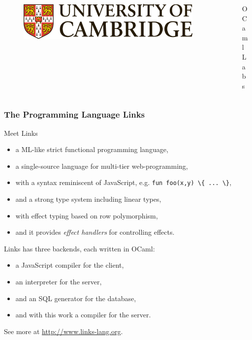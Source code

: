 \documentclass[10pt,compress]{beamer}
\begin{document}
\begin{frame}[plain]
\vfill

\begin{columns}[T]
\begin{column}{0.5\textwidth}
\begin{figure}
\includegraphics[scale=0.18]{figures/cambridge.eps}
\end{figure}
\end{column}
\hfill
\begin{column}{0.5\textwidth}
\begin{figure}
OCaml Labs
\end{figure}
\end{column}
\end{columns}

\end{frame}

\begin{frame}[plain]
  \maketitle
\end{frame}

\begin{frame}
\frametitle{The Programming Language Links}
Meet Links
\begin{itemize}
  \item a ML-like strict functional programming language,
  \item a single-source language for multi-tier web-programming,
  \item with a syntax reminiscent of JavaScript, e.g. \lstinline$fun foo(x,y) \{ ... \}$,
  \item and a strong type system including linear types,
  \item with effect typing based on row polymorphism,
  \item and it provides \emph{effect handlers} for controlling effects.
\end{itemize}
Links has three backends, each written in OCaml:
\begin{itemize}
 \item a JavaScript compiler for the client,
 \item an interpreter for the server,
 \item and an SQL generator for the database,
 \item and with this work a compiler for the server.
\end{itemize}
See more at \url{http://www.links-lang.org}.
\end{frame}
\end{document}
